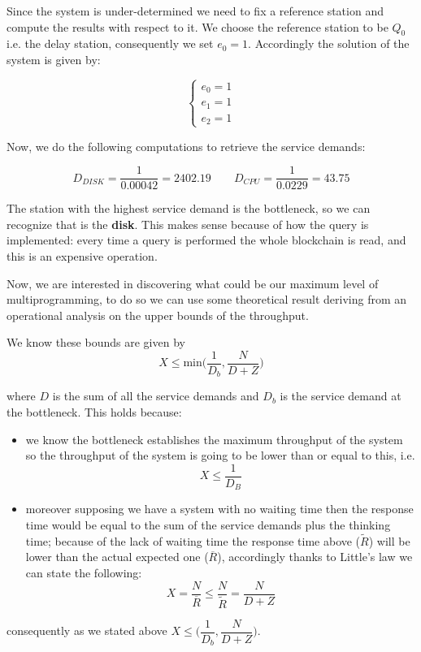 \documentclass[11pt]{scrartcl} %
\begin{document}
Since the system is under-determined we need to fix a reference station and compute the  results with respect to it. We choose the reference station to  be $Q_0$ i.e. the  delay station, consequently we set $e_0 = 1$. Accordingly the solution of the system is given by:

$$\begin{cases} e_0=1\\ e_1=1\\ e_2=1\end{cases}$$

Now, we do the following computations to retrieve the service demands:

$$D_{DISK}=\dfrac{1}{0.00042}=2402.19\qquad D_{CPU}=\dfrac{1}{0.0229}=43.75$$

The station with the highest service demand is the bottleneck, so we can recognize that is the \textbf{disk}. This makes sense because of how the query is implemented: every time a query is performed the whole blockchain is read, and this is an expensive operation.

Now, we are interested in discovering what could be our maximum level of multiprogramming, to do so we can use some theoretical result deriving from an operational analysis on the upper bounds of the throughput.


We know these bounds are given by $$X\leq \mathrm{min}\bigg(\dfrac{1}{D_b}, \dfrac{N}{D+Z}\bigg)$$

where $D$ is the sum of all the service demands and $D_b$ is the service demand at the bottleneck. This holds because:

\begin{itemize}
\item[\adforn{43}] we know the bottleneck establishes the maximum throughput of the system so the throughput of  the system is going to be lower than or equal to this, i.e. $$X\leq \dfrac{1}{D_B}$$ 
\item[\adforn{43}] moreover supposing we have a system with no waiting time then the response time would be equal to the sum of the service demands plus the thinking time; because of the lack of waiting time the response time above ($\widetilde{R}$) will be lower than the actual expected one ($\overline{R}$), accordingly thanks to Little's law we can state the following: $$X=\dfrac{N}{\overline{R}}\leq \dfrac{N}{\widetilde{R}}=\dfrac{N}{D+Z}$$
\end{itemize}

consequently as we stated above $X\leq\bigg(\dfrac{1}{D_b}, \dfrac{N}{D+Z}\bigg)$.\\
\end{document}
